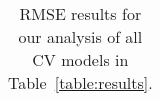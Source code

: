 \begin{table}[t]
\begin{center}
\begin{tabular}{|c|c|c|c|c|c|}
\hline
\end{tabular}
\vspace{-5mm}
\end{center}
\caption{RMSE results for our analysis of all CV models in Table~\ref{table:results}. }
\label{table:RMSEresults}
\end{table}

